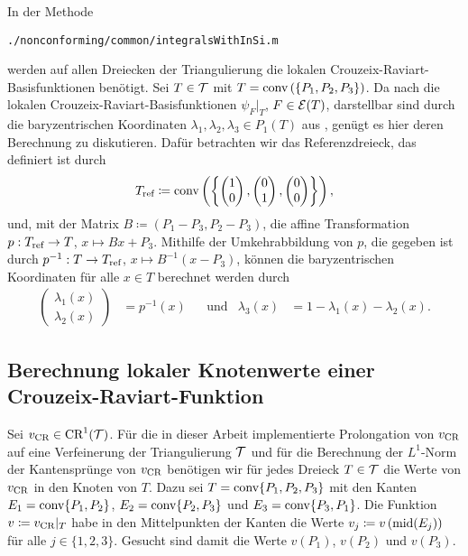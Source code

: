 In der Methode
\begin{center}
  \texttt{./nonconforming/common/integralsWithInSi.m}
\end{center}
werden auf allen Dreiecken der Triangulierung die lokalen
Crouzeix-Raviart-Basis\-funk\-tio\-nen benötigt. 
Sei $T\in\mathcal{T}$ mit $T=\textup{conv}\left(\{P_1,P_2,P_3\}\right)$.
Da nach  die lokalen
Crouzeix-Raviart-Basisfunktionen $\psi_{F}|_T$, $F\in\mathcal{E}(T)$, darstellbar
sind durch die baryzentrischen Koordinaten $\lambda_1,\lambda_2,\lambda_3\in
P_1(T)$ aus , genügt es hier deren
Berechnung zu diskutieren.
Dafür betrachten wir das Referenzdreieck, das definiert ist durch
\begin{align*}
  T_\textup{ref} \coloneqq
  \textup{conv}\left(\left\{
  \begin{pmatrix}
   1\\0 
  \end{pmatrix},
  \begin{pmatrix}
   0\\1 
  \end{pmatrix},
  \begin{pmatrix}
   0\\0 
  \end{pmatrix}
  \right\}\right),
\end{align*}
und, mit der Matrix $B\coloneqq (P_1-P_3,P_2-P_3)$, die affine Transformation
$p:T_\textup{ref} \to T$, $x \mapsto Bx+P_3$. 
Mithilfe der Umkehrabbildung von $p$, die gegeben ist durch $p^{-1}:T\to T_\textup{ref}$,
$x\mapsto B^{-1}(x-P_3)$, können die baryzentrischen Koordinaten für alle $x\in
T$ berechnet werden durch 
\begin{align*}
  \begin{pmatrix}
    \lambda_1(x)\\
    \lambda_2(x)
  \end{pmatrix}
  &=
  p^{-1}(x) &&\text{und}
  &\lambda_3(x)
  &=1-\lambda_1(x)-\lambda_2(x).
\end{align*}


\subsection{Berechnung lokaler Knotenwerte einer Crouzeix-Raviart-Funktion}
\label{sec:localNodalValuesCR}

Sei $v_\textup{CR}\in\textup{CR}^1(\mathcal{T})$.
Für die in dieser Arbeit implementierte Prolongation von $v_\textup{CR}$ auf eine
Verfeinerung der Triangulierung $\mathcal{T}$ und für die Berechnung der $L^1$-Norm
der Kantensprünge von $v_\textup{CR}$ benötigen wir für jedes Dreieck $T\in\mathcal{T}$ die
Werte von $v_\textup{CR}$ in den Knoten von $T$. 
Dazu sei $T = \textup{conv}\{P_1, P_2, P_3\}$ mit den Kanten
$E_1 = \textup{conv}\{P_1,P_2\}$, $E_2 = \textup{conv}\{P_2,P_3\}$ und $E_3 =
\textup{conv}\{P_3,P_1\}$. 
Die Funktion $v\coloneqq v_\textup{CR}|_T$ habe in den Mittelpunkten der Kanten die Werte
$v_j\coloneqq v\left(\textup{mid}(E_j)\right)$ für alle $j\in\{1,2,3\}$. 
Gesucht sind damit die Werte $v(P_1)$, $v(P_2)$ und $v(P_3)$.

